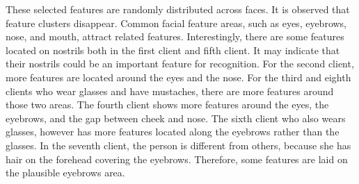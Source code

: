 These selected features are randomly distributed across faces. It is observed that feature clusters disappear. Common facial feature areas, such as eyes, eyebrows, nose, and mouth, attract related features. Interestingly, there are some features located on nostrils both in the first client and fifth client. It may indicate that their nostrils could be an important feature for recognition. For the second client, more features are located around the eyes and the nose. For the third and eighth clients who wear glasses and have mustaches, there are more features around those two areas. The fourth client shows more features around the eyes, the eyebrows, and the gap between cheek and nose. The sixth client who also wears glasses, however has more features located along the eyebrows rather than the glasses. In the seventh client, the person is different from others, because she has hair on the forehead covering the eyebrows. Therefore, some features are laid on the plausible eyebrows area. 


